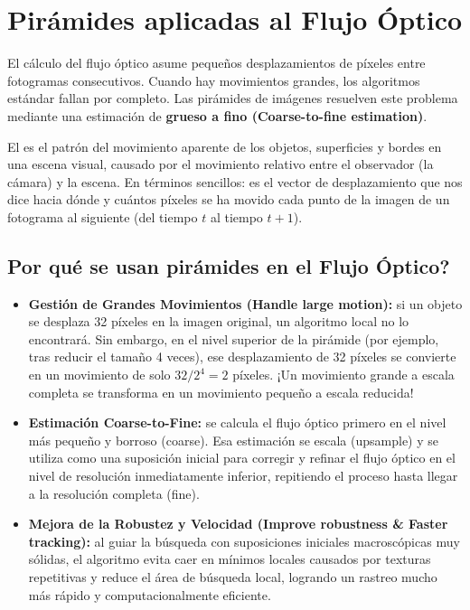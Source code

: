 \section{Pirámides aplicadas al Flujo Óptico}
El cálculo del flujo óptico asume pequeños desplazamientos de píxeles entre fotogramas consecutivos. Cuando hay movimientos grandes, los algoritmos estándar fallan por completo. Las pirámides de imágenes resuelven este problema mediante una estimación de \textbf{grueso a fino (Coarse-to-fine estimation)}.

\begin{definicion}
    El  es el patrón del movimiento aparente de los objetos, superficies y bordes en una escena visual, causado por el movimiento relativo entre el observador (la cámara) y la escena. En términos sencillos: es el vector de desplazamiento que nos dice hacia dónde y cuántos píxeles se ha movido cada punto de la imagen de un fotograma al siguiente (del tiempo $t$ al tiempo $t+1$).
\end{definicion}

\subsection{\textquestiondown Por qué se usan pirámides en el Flujo Óptico?}
\begin{itemize}
    \item \textbf{Gestión de Grandes Movimientos (Handle large motion):} si un objeto se desplaza 32 píxeles en la imagen original, un algoritmo local no lo encontrará. Sin embargo, en el nivel superior de la pirámide (por ejemplo, tras reducir el tamaño 4 veces), ese desplazamiento de 32 píxeles se convierte en un movimiento de solo $32 / 2^4 = 2$ píxeles. ¡Un movimiento grande a escala completa se transforma en un movimiento pequeño a escala reducida!
    \item \textbf{Estimación Coarse-to-Fine:} se calcula el flujo óptico primero en el nivel más pequeño y borroso (coarse). Esa estimación se escala (upsample) y se utiliza como una suposición inicial para corregir y refinar el flujo óptico en el nivel de resolución inmediatamente inferior, repitiendo el proceso hasta llegar a la resolución completa (fine).
    \item \textbf{Mejora de la Robustez y Velocidad (Improve robustness \& Faster tracking):} al guiar la búsqueda con suposiciones iniciales macroscópicas muy sólidas, el algoritmo evita caer en mínimos locales causados por texturas repetitivas y reduce el área de búsqueda local, logrando un rastreo mucho más rápido y computacionalmente eficiente.
\end{itemize}
